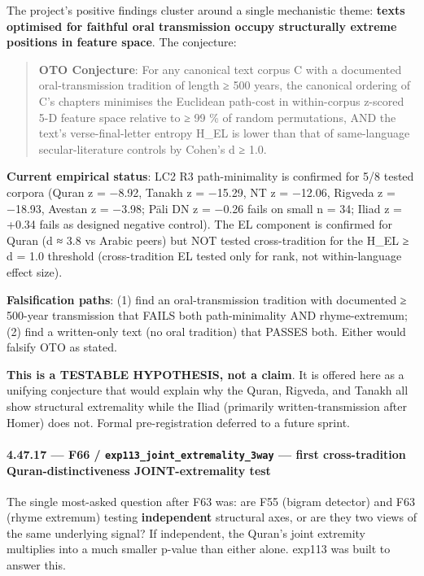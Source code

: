 \documentclass[
]{article}
\begin{document}
The project's positive findings cluster around a single mechanistic
theme: \textbf{texts optimised for faithful oral transmission occupy
structurally extreme positions in feature space}. The conjecture:

\begin{quote}
\textbf{OTO Conjecture}: For any canonical text corpus C with a
documented oral-transmission tradition of length ≥ 500 years, the
canonical ordering of C's chapters minimises the Euclidean path-cost in
within-corpus z-scored 5-D feature space relative to ≥ 99 \% of random
permutations, AND the text's verse-final-letter entropy H\_EL is lower
than that of same-language secular-literature controls by Cohen's d ≥
1.0.
\end{quote}

\textbf{Current empirical status}: LC2 R3 path-minimality is confirmed
for 5/8 tested corpora (Quran z = −8.92, Tanakh z = −15.29, NT z =
−12.06, Rigveda z = −18.93, Avestan z = −3.98; Pāli DN z = −0.26 fails
on small n = 34; Iliad z = +0.34 fails as designed negative control).
The EL component is confirmed for Quran (d ≈ 3.8 vs Arabic peers) but
NOT tested cross-tradition for the H\_EL ≥ d = 1.0 threshold
(cross-tradition EL tested only for rank, not within-language effect
size).

\textbf{Falsification paths}: (1) find an oral-transmission tradition
with documented ≥ 500-year transmission that FAILS both path-minimality
AND rhyme-extremum; (2) find a written-only text (no oral tradition)
that PASSES both. Either would falsify OTO as stated.

\textbf{This is a TESTABLE HYPOTHESIS, not a claim}. It is offered here
as a unifying conjecture that would explain why the Quran, Rigveda, and
Tanakh all show structural extremality while the Iliad (primarily
written-transmission after Homer) does not. Formal pre-registration
deferred to a future sprint.

\paragraph{\texorpdfstring{4.47.17 --- F66 /
\texttt{exp113\_joint\_extremality\_3way} --- first cross-tradition
Quran-distinctiveness JOINT-extremality
test}{4.47.17 --- F66 / exp113\_joint\_extremality\_3way --- first cross-tradition Quran-distinctiveness JOINT-extremality test}}\label{f66-exp113_joint_extremality_3way-first-cross-tradition-quran-distinctiveness-joint-extremality-test}

The single most-asked question after F63 was: are F55 (bigram detector)
and F63 (rhyme extremum) testing \textbf{independent} structural axes,
or are they two views of the same underlying signal? If independent, the
Quran's joint extremity multiplies into a much smaller p-value than
either alone. exp113 was built to answer this.
\end{document}
